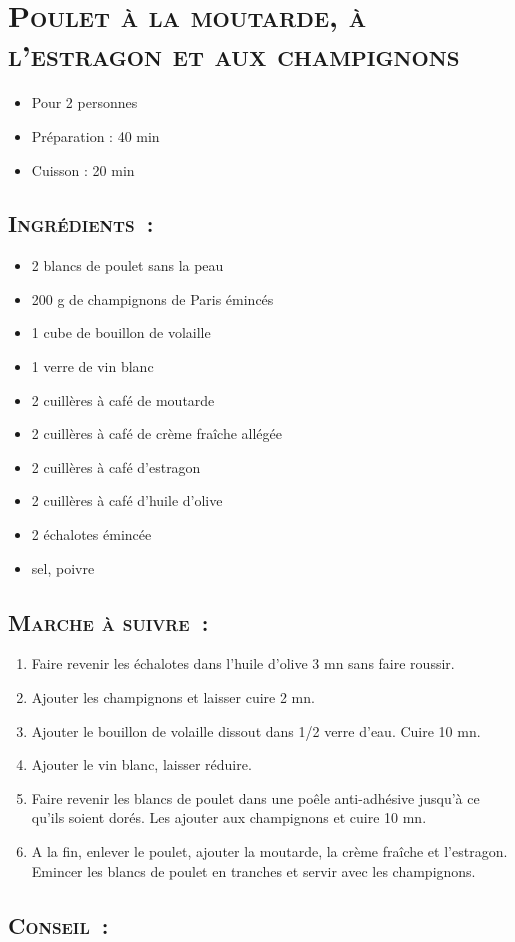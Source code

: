 \section[\normalsize{Poulet \`a la moutarde, \`a l'estragon et aux champignons}]{\LARGE{\textsc{Poulet \`a la moutarde, \`a l'estragon et aux champignons}}}		%


\begin{itemize}
\item Pour 2 personnes
\item Préparation : 40 min
\item Cuisson : 20 min
\end{itemize}

\subsection*{\textsc{Ingr\'edients~:}}

\begin{itemize}
\item 2 blancs de poulet sans la peau
\item 200 g de champignons de Paris \'eminc\'es
\item 1 cube de bouillon de volaille
\item 1 verre de vin blanc
\item 2 cuill\`eres \`a caf\'e de moutarde
\item 2 cuill\`eres \`a caf\'e de cr\`eme fra\^iche all\'eg\'ee
\item 2 cuill\`eres \`a caf\'e d'estragon
\item 2 cuill\`eres \`a caf\'e d'huile d'olive
\item 2 \'echalotes \'eminc\'ee
\item sel, poivre
\end{itemize}


\subsection*{\textsc{Marche \`a suivre~:}}

\begin{enumerate}
\item Faire revenir les \'echalotes dans l'huile d'olive 3 mn sans faire roussir. 
\item Ajouter les champignons et laisser cuire 2 mn. 
\item Ajouter le bouillon de volaille dissout dans 1/2 verre d'eau. Cuire 10 mn. 
\item Ajouter le vin blanc, laisser r\'eduire.
\item Faire revenir les blancs de poulet dans une po\^ele anti-adh\'esive jusqu'\`a ce qu'ils soient dor\'es. Les ajouter aux champignons et cuire 10 mn.
\item A la fin, enlever le poulet, ajouter la moutarde, la cr\`eme fra\^iche et l'estragon. Emincer les blancs de poulet en tranches et servir avec les champignons.
\end{enumerate}
\subsection*{\textsc{Conseil~:}}


